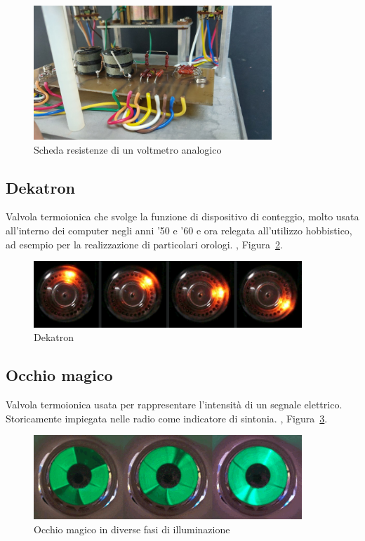 \documentclass[12pt,a4paper]{report}
\begin{document}
\begin{figure}[h]
  \centering
  \includegraphics[width=0.8\textwidth]{schedaresistenze}
  \caption{Scheda resistenze di un voltmetro analogico}
  \label{fig:schedaresistenze}
\end{figure}


\subsection{Dekatron}
Valvola termoionica che svolge la funzione di dispositivo di conteggio, molto usata all'interno dei computer negli anni '50 e '60 e ora
relegata all'utilizzo hobbistico, ad esempio per la realizzazione di particolari orologi. \cite{itwiki:118300354}, Figura~\ref{fig:dekatron}.

\begin{figure}[h]
  \centering
  \includegraphics[width=0.9\textwidth]{dekatron}
  \caption{Dekatron \cite{itwiki:118300354}}
  \label{fig:dekatron}
\end{figure}

\subsection{Occhio magico}
Valvola termoionica usata per rappresentare l'intensità di un segnale elettrico. Storicamente impiegata nelle radio come
indicatore di sintonia. \cite{itwiki:119250611}, Figura~\ref{fig:occhiomagicofasi}.

\begin{figure}[h]
  \centering
  \includegraphics[width=0.9\textwidth]{occhiomagicofasi}
  \caption{Occhio magico in diverse fasi di illuminazione \cite{itwiki:119250611}}
  \label{fig:occhiomagicofasi}
\end{figure}
\end{document}
